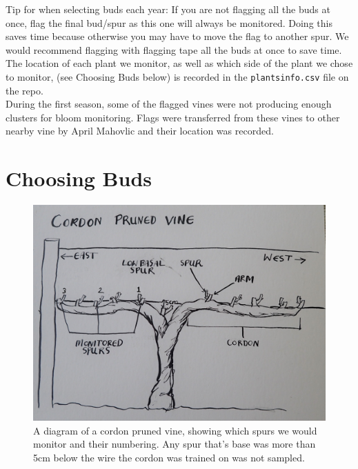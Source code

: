 \documentclass[11pt,letter]{article}
\begin{document}
Tip for when selecting buds each year: If you are not flagging all the buds at once, flag the final bud/spur as this one will always be monitored. Doing this saves time because otherwise you may have to move the flag to another spur. We would recommend flagging with flagging tape all the buds at once to save time.\\

The location of each plant we monitor, as well as which side of the plant we chose to monitor, (see Choosing Buds below) is recorded in the \verb|plantsinfo.csv| file on the repo. \\

During the first season, some of the flagged vines were not producing enough clusters for bloom monitoring. Flags were transferred from these vines to other nearby vine by April Mahovlic and their location was recorded.

\section{Choosing Buds}


\begin{figure}
  \includegraphics[width=\linewidth]{CordonPruned.jpg}
  \caption{A diagram of a cordon pruned vine, showing which spurs we would monitor and their numbering. Any spur that's base was more than 5cm below the wire the cordon was trained on was not sampled.}
  \label{fig:CordonPruned}
\end{figure}
\end{document}
